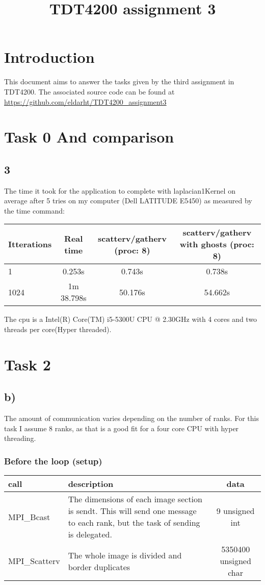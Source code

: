 \documentclass{article}
\title{TDT4200 assignment 3}
\begin{document}
\maketitle
\section*{Introduction}
This document aims to answer the tasks given by the third assignment in TDT4200.
The associated source code can be found at \url{https://github.com/eldarht/TDT4200_assignment3}

\section*{Task 0 And comparison}
\subsection*{3}
The time it took for the application to complete with laplacian1Kernel on average after 5 tries on my computer (Dell LATITUDE E5450) as measured by the time command:

\begin{tabular}{|l|c|c|c|}
	Itterations & Real time  & scatterv/gatherv (proc: 8) & scatterv/gatherv with ghosts (proc: 8)\\
	\hline
	1			& 0.253s	 & 0.743s	& 0.738s\\
	1024		& 1m 38.798s & 50.176s	& 54.662s\\
\end{tabular}

The cpu is a Intel(R) Core(TM) i5-5300U CPU @ 2.30GHz with 4 cores and two threads per core(Hyper threaded).

\section*{Task 2}
\subsection*{b)}
The amount of communication varies depending on the number of ranks. For this task I assume 8 ranks, as that is a good fit for a four core CPU with hyper threading. \\

\subsubsection*{Before the loop (setup)}
\begin{tabular}{l|p{200px}|c|}
	call & description & data \\
	\hline
	MPI\_Bcast & The dimensions of each image section is sendt. This will send one message to each rank, but the task of sending is delegated. & 9 unsigned int \\
	\hline
	MPI\_Scatterv & The whole image is divided and border duplicates & 5350400 unsigned char \\
\end{tabular}
\end{document}
